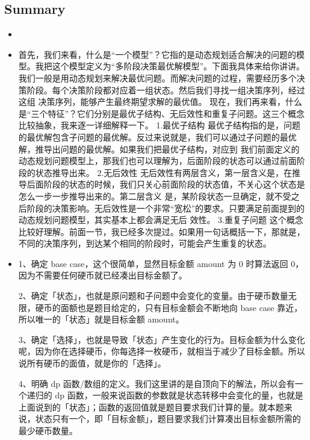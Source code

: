 \documentclass[a4paper,11pt,twoside]{book}
\begin{document}
\subsection{Summary}
\iffalse
\begin{itemize}
	\item %
	
	\item \iffalse
	首先，我们来看，什么是“一个模型”？它指的是动态规划适合解决的问题的模型。我把这个模型定义为“多阶段决策最优解模型”。下面我具体来给你讲讲。
	我们一般是用动态规划来解决最优问题。而解决问题的过程，需要经历多个决策阶段。每个决策阶段都对应着一组状态。然后我们寻找一组决策序列，经过这组
	决策序列，能够产生最终期望求解的最优值。
	现在，我们再来看，什么是“三个特征”？它们分别是最优子结构、无后效性和重复子问题。这三个概念比较抽象，我来逐一详细解释一下。
	1.最优子结构
	最优子结构指的是，问题的最优解包含子问题的最优解。反过来说就是，我们可以通过子问题的最优解，推导出问题的最优解。如果我们把最优子结构，对应到
	我们前面定义的动态规划问题模型上，那我们也可以理解为，后面阶段的状态可以通过前面阶段的状态推导出来。
	2.无后效性
	无后效性有两层含义，第一层含义是，在推导后面阶段的状态的时候，我们只关心前面阶段的状态值，不关心这个状态是怎么一步一步推导出来的。第二层含义
	是，某阶段状态一旦确定，就不受之后阶段的决策影响。无后效性是一个非常“宽松”的要求。只要满足前面提到的动态规划问题模型，其实基本上都会满足无后
	效性。
	3.重复子问题
	这个概念比较好理解。前面一节，我已经多次提过。如果用一句话概括一下，那就是，不同的决策序列，到达某个相同的阶段时，可能会产生重复的状态。
	

	\item 1、确定 base case，这个很简单，显然目标金额 amount 为 0 时算法返回 0，因为不需要任何硬币就已经凑出目标金额了。
	
	2、确定「状态」，也就是原问题和子问题中会变化的变量。由于硬币数量无限，硬币的面额也是题目给定的，只有目标金额会不断地向 base case 靠近，所以唯一的「状态」就是目标金额 amount。
	
	3、确定「选择」，也就是导致「状态」产生变化的行为。目标金额为什么变化呢，因为你在选择硬币，你每选择一枚硬币，就相当于减少了目标金额。所以说所有硬币的面值，就是你的「选择」。
	
	4、明确 dp 函数/数组的定义。我们这里讲的是自顶向下的解法，所以会有一个递归的 dp 函数，一般来说函数的参数就是状态转移中会变化的量，也就是上面说到的「状态」；函数的返回值就是题目要求我们计算的量。就本题来说，状态只有一个，即「目标金额」，题目要求我们计算凑出目标金额所需的最少硬币数量。
	

\end{itemize}
\end{document}
